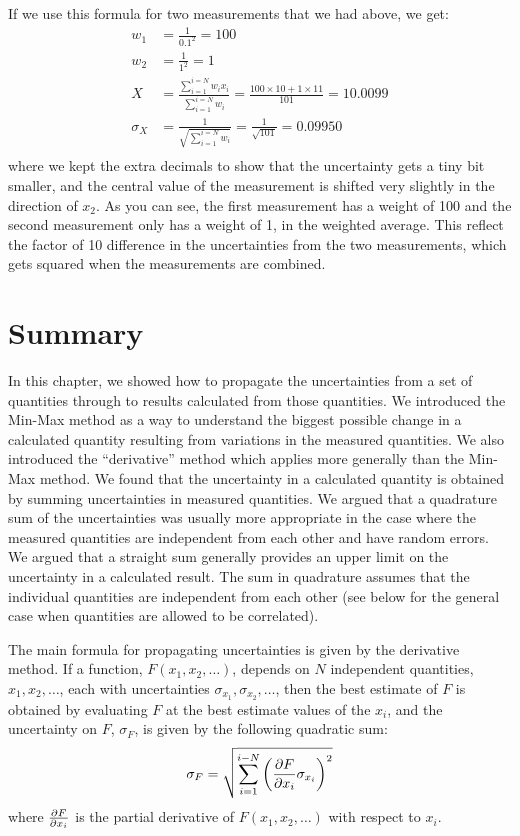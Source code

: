 If we use this formula for two measurements that we had above, we get:
\begin{align*}
w_1 &= \frac{1}{0.1^2}=100\\
w_2 &= \frac{1}{1^2}=1\\
X &= \frac{\sum_{i=1}^{i=N}w_ix_i}{\sum_{i=1}^{i=N}w_i}=\frac{100\times 10+1\times 11}{101}=10.0099\\
\sigma_{X} &= \frac{1}{\sqrt{\sum_{i=1}^{i=N}w_i}}=\frac{1}{\sqrt{101}}=0.09950\\
\end{align*}
where we kept the extra decimals to show that the uncertainty gets a tiny bit smaller, and the central value of the measurement is shifted very slightly in the direction of $x_2$. As you can see, the first measurement has a weight of 100 and the second measurement only has a weight of 1, in the weighted average. This reflect the factor of 10 difference in the uncertainties from the two measurements, which gets squared when the measurements are combined. 

\section{Summary}
In this chapter, we showed how to propagate the uncertainties from a set of quantities through to results calculated from those quantities. We introduced the Min-Max method as a way to understand the biggest possible change in a calculated quantity resulting from variations in the measured quantities. We also introduced the ``derivative'' method which applies more generally than the Min-Max method. We found that the uncertainty in a calculated quantity is obtained by summing uncertainties in measured quantities. We argued that a quadrature sum of the uncertainties was usually more appropriate in the case where the measured quantities are independent from each other and have random errors. We argued that a straight sum generally provides an upper limit on the uncertainty in a calculated result. The sum in quadrature assumes that the individual quantities are independent from each other (see below for the general case when quantities are allowed to be correlated).

The main formula for propagating uncertainties is given by the derivative method. If a function, $F(x_1, x_2, \dots)$, depends on $N$ independent quantities, $x_1, x_2, \dots$, each with uncertainties $\sigma_{x_1}, \sigma_{x_2}, \dots$, then the best estimate of $F$ is obtained by evaluating $F$ at the best estimate values of the $x_i$, and the uncertainty on $F$, $\sigma_{F}$, is given by the following quadratic sum:
\begin{align}
\sigma_{F} = \sqrt{\sum_{i=1}^{i-N}\left(\frac{\partial F}{\partial x_i}\sigma_{x_i}\right)^2}
\end{align}
where $\frac{\partial F}{\partial x_i}$ is the partial derivative of $F(x_1, x_2, \dots)$ with respect to $x_i$.

